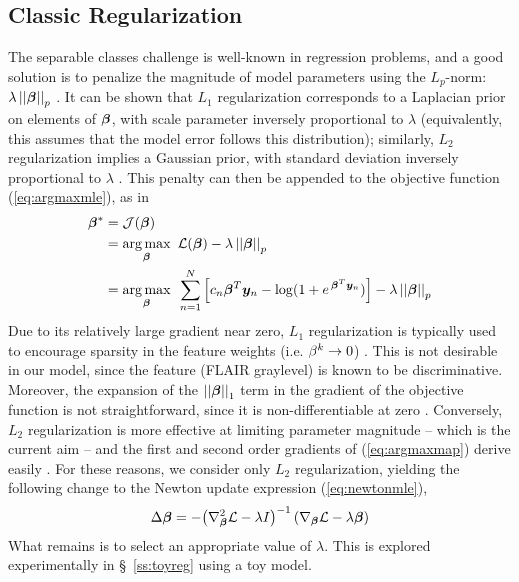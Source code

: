 \subsection{Classic Regularization}
The separable classes challenge is well-known in regression problems, and a good solution is to penalize the magnitude of model parameters using the $L_p$-norm: $\lambda\left|\left|\bm{\beta}\right|\right|_p$ \cite{Zou2005}. It can be shown that $L_1$ regularization corresponds to a Laplacian prior on elements of $\bm{\beta}$, with scale parameter inversely proportional to $\lambda$ (equivalently, this assumes that the model error follows this distribution); similarly, $L_2$ regularization implies a Gaussian prior, with standard deviation inversely proportional to $\lambda$ \cite{Zou2005}. This penalty can then be appended to the objective function (\ref{eq:argmaxmle}), as in 
\begin{align}
\bm{\beta}^* &= \mathcal{J}(\bm{\beta})\nonumber\\
&= \underset{\bm{\beta}}{\arg\max}\enspace\mathcal{L}(\bm{\beta}) - \lambda\left|\left|\bm{\beta}\right|\right|_p \nonumber\\
&= \underset{\bm{\beta}}{\arg\max}\enspace\sum_{n=1}^{N} \Big[ c_n \bm{\beta}^T\bm{y}_n - \log (1+e^{\thinspace\bm{\beta}^T\bm{y}_n}) \Big] - \lambda\left|\left|\bm{\beta}\right|\right|_p
\label{eq:argmaxmap}
\end{align}
Due to its relatively large gradient near zero, $L_1$ regularization is typically used to encourage sparsity in the feature weights (i.e. $\beta^k\rightarrow0$) \cite{Tibshirani1996}. This is not desirable in our model, since the feature (FLAIR graylevel) is known to be discriminative. Moreover, the expansion of the $\left|\left|\bm{\beta}\right|\right|_1$ term in the gradient of the objective function is not straightforward, since it is non-differentiable at zero \cite{Tibshirani1996,Lee2006}. Conversely, $L_2$ regularization is more effective at limiting parameter magnitude -- which is the current aim -- and the first and second order gradients of (\ref{eq:argmaxmap}) derive easily \cite{Minka2003}. For these reasons, we consider only $L_2$ regularization, yielding the following change to the Newton update expression (\ref{eq:newtonmle}),
\begin{equation}
\Delta\bm{\beta} = -{\left(\nabla^2_{\bm{\beta}}\mathcal{L}-\lambda I\right)}^{-1}\left(\nabla_{\bm{\beta}}\mathcal{L}-\lambda\bm{\beta}\right)
\label{eq:newtonmap}
\end{equation}
What remains is to select an appropriate value of $\lambda$. This is explored experimentally in \S\ \ref{ss:toyreg} using a toy model.

